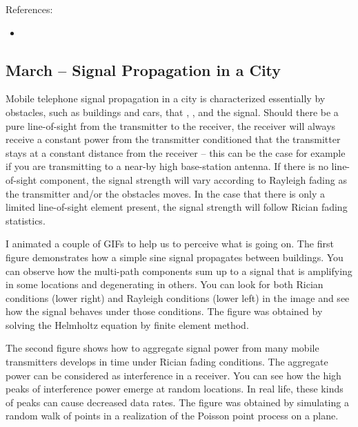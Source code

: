 \documentclass{article}
\def\pass{https://www.passwordstore.org/}
\begin{document}
References:

\begin{itemize}
\item \htmladdnormallink{Password Store}{\pass}
\end{itemize}


\subsection{March – Signal Propagation in a City}
Mobile telephone signal propagation in a city is characterized essentially by obstacles, such as buildings and cars, that , ,  and  the signal. Should there be a pure line-of-sight from the transmitter to the receiver, the receiver will always receive a constant power from the transmitter conditioned that the transmitter stays at a constant distance from the receiver – this can be the case for example if you are transmitting to a near-by high base-station antenna. If there is no line-of-sight component, the signal strength will vary according to Rayleigh fading as the transmitter and/or the obstacles moves. In the case that there is only a limited line-of-sight element present, the signal strength will follow Rician fading statistics.

I animated a couple of GIFs to help us to perceive what is going on.
The first figure demonstrates how a simple sine signal propagates between buildings. You can observe how the multi-path components sum up to a signal that is amplifying in some locations and degenerating in others. You can look for both Rician conditions (lower right) and Rayleigh conditions (lower left) in the image and see how the signal behaves under those conditions. The figure was obtained by solving the Helmholtz equation by finite element method.


The second figure shows how to aggregate signal power from many mobile transmitters develops in time under Rician fading conditions. The aggregate power can be considered as interference in a receiver. You can see how the high peaks of interference power emerge at random locations. In real life, these kinds of peaks can cause decreased data rates. The figure was obtained by simulating a random walk of points in a realization of the Poisson point process on a plane.
\end{document}
